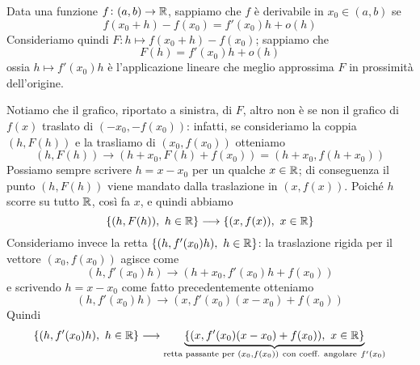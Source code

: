 Data una funzione $f\colon(a,b)\to\amsbb{R}$, sappiamo che $f$ è derivabile in $x_0\in(a,b)$ se 
\[
f(x_0+h) -f(x_0) = f'(x_0)h+o(h)
\]
Consideriamo quindi $F\colon h\mapsto f(x_0+h)-f(x_0)$; sappiamo che
\[
F(h) = f'(x_0)h +o(h)
\]
ossia $h\mapsto f'(x_0)h$ è l'applicazione lineare che meglio approssima $F$ in prossimità dell'origine.
\begin{center}
    \begin{minipage}{.45\linewidth}
        \centering
    \end{minipage}
    \hspace{1pt}
    \begin{minipage}{.45\linewidth}
        \centering
    \end{minipage}
\end{center}
Notiamo che il grafico, riportato a sinistra, di $F$, altro non è se non il grafico di $f(x)$ traslato di $(-x_0, -f(x_0))$: infatti, se consideriamo la coppia $(h, F(h))$ e la trasliamo di $(x_0, f(x_0))$ otteniamo
\[
(h, F(h)) \longrightarrow (h+x_0, F(h)+f(x_0)) = (h+x_0, f(h+x_0))
\]
Possiamo sempre scrivere $h=x-x_0$ per un qualche $x\in\amsbb{R}$; di conseguenza il punto $(h, F(h))$ viene mandato dalla traslazione in $(x,f(x))$. Poiché $h$ scorre su tutto $\amsbb{R}$, così fa $x$, e quindi abbiamo
\[
\{(h, F(h)), \ h\in\amsbb{R}\}\longrightarrow \{(x, f(x)), \ x\in\amsbb{R}\}
\]
Consideriamo invece la retta $\{(h, f'(x_0)h), \ h\in\amsbb{R}\}$: la traslazione rigida per il vettore $(x_0, f(x_0))$ agisce come
\[
(h, f'(x_0)h)\longrightarrow (h+x_0, f'(x_0)h+f(x_0))
\]
e scrivendo $h=x-x_0$ come fatto precedentemente otteniamo
\[
(h, f'(x_0)h)\longrightarrow (x, f'(x_0)(x-x_0) + f(x_0))
\]
Quindi
\[
\{(h, f'(x_0)h), \ h\in\amsbb{R}\} \longrightarrow \underbrace{\{(x, f'(x_0)(x-x_0)+f(x_0)), \ x\in\amsbb{R}\}}_{\text{retta passante per }(x_0, f(x_0)) \ \text{con coeff. angolare} \ f'(x_0)}
\]
